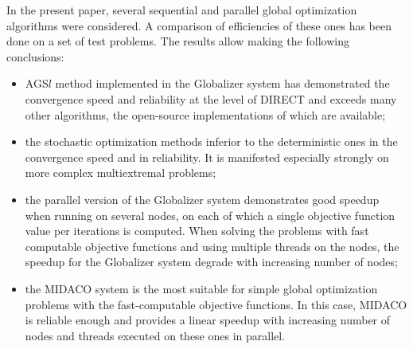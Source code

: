 \documentclass[runningheads]{llncs}
\begin{document}
In the present paper, several sequential and parallel global optimization algorithms were considered.
A comparison of efficiencies of these ones has been done on a set of test problems. The results allow
making the following conclusions:
\begin{itemize}
  \item AGS\(l\) method implemented in the Globalizer system has demonstrated the convergence
speed and reliability at the level of DIRECT and exceeds many other algorithms, the open-source
implementations of which are available;
  \item the stochastic optimization methods inferior to the deterministic ones in the convergence
speed and in reliability. It is manifested especially strongly on more complex multiextremal
problems;
  \item the parallel version of the Globalizer system demonstrates good speedup
when running on several nodes, on each of which a single objective function value per iterations is
computed. When solving the problems with fast computable objective functions and using multiple
threads on the nodes, the speedup for the Globalizer system degrade with increasing
number of nodes;
  \item the MIDACO system is the most suitable for simple global optimization problems with the
fast-computable objective functions. In this case, MIDACO is reliable enough and provides a linear
speedup with increasing number of nodes and threads executed on these ones in parallel.
\end{itemize}

%

{}
%
\end{document}
